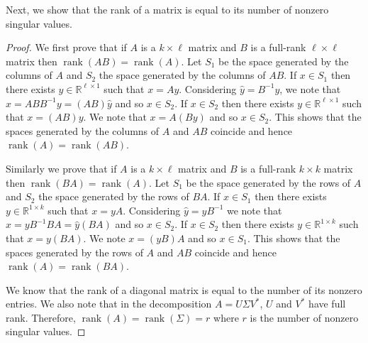 \documentclass[11pt]{article}
\DeclareMathOperator{\rank}{rank}
\newcommand{\real}{\mathbb{R}} %
\begin{document}
Next, we show that the rank of a matrix is equal to its number of nonzero singular values.
\begin{proof}
    We first prove that if $A$ is a $k\times \ell$ matrix and $B$ is a full-rank $\ell \times \ell$ matrix then $\rank(AB)=\rank(A)$.
    Let $S_1$ be the space generated by the columns of $A$ and $S_2$ the space generated by the columns of $AB$.
    If $x\in S_1$ then there exists $y\in \real^{\ell \times 1}$ such that $x=Ay$.
    Considering $\hat{y}=B^{-1}y$, we note that $x=ABB^{-1}y=(AB)\hat{y}$ and so $x\in S_2$. If $x\in S_2$ then there exists $y\in \real^{\ell\times 1}$ such that $x=(AB)y$.
    We note that $x=A(By)$ and so $x\in S_2$. This shows that the spaces generated by the columns of $A$ and $AB$ coincide and hence $\rank(A)=\rank(AB)$.
    
    Similarly we prove that if $A$ is a $k \times \ell$ matrix and $B$ is a full-rank $k\times k$ matrix then $\rank(BA)=\rank(A)$.
    Let $S_1$ be the space generated by the rows of $A$ and $S_2$ the space generated by the rows of $BA$.
    If $x\in S_1$ then there exists $y\in \real^{1\times k}$ such that $x=yA$. Considering $\hat{y}=yB^{-1}$ we note that $x=yB^{-1}BA=\hat{y}(BA)$ and so $x\in S_2$. If $x\in S_2$ then there exists $y\in \real^{1\times k}$ such that $x=y(BA)$.
    We note $x=(yB)A$ and so $x\in S_1$. This shows that the spaces generated by the rows of $A$ and $AB$ coincide and hence $\rank(A)=\rank(BA)$.
    
	We know that the rank of a diagonal matrix is equal to the number of its nonzero entries.
	We also note that in the decomposition \(A = U \Sigma V^*\), \(U\) and \(V^*\) have full rank.
	Therefore, \(\rank(A) = \rank(\Sigma) = r\) where $r$ is the number of nonzero singular values.
\end{proof}
\end{document}
